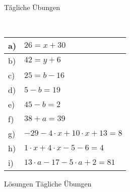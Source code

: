 \documentclass[12pt]{article}
\begin{document}
\centerline{{\Large Tägliche Übungen}} 
\vspace{1cm}
\noindent \\


\begin{xltabular}{\textwidth}{|C{0.75cm}|X|}
\hline
a)&$26=x+30$
\\\hline
b)&$42=y+6$
\\\hline
c)&$25=b-16$
\\\hline
d)&$5-b=19$
\\\hline
e)&$45-b=2$
\\\hline
f)&$38+a=39$
\\\hline
g)&$-29-4\cdot x+10\cdot x+13=8$
\\\hline
h)&$1\cdot x+4\cdot x-5-6=4$
\\\hline
i)&$13\cdot a-17-5\cdot a+2=81$
\\\hline
\end{xltabular}
\vspace{0.5cm}
\newpage
{}
\centerline{{\large Lösungen Tägliche Übungen}} 
\vspace{0.5cm}
\end{document}
